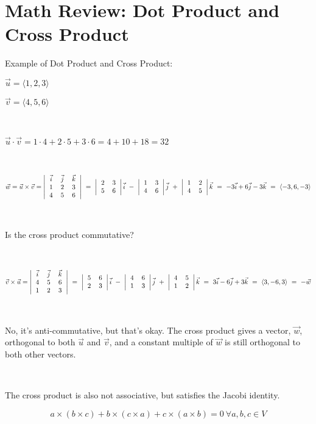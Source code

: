 \section{Math Review:  Dot Product and Cross Product}

Example of Dot Product and Cross Product:

$\vec{u} = \langle 1,2,3 \rangle$

$\vec{v} = \langle 4,5,6 \rangle$

\

$\vec{u} \cdot \vec{v} = 1 \cdot 4 + 2 \cdot 5 + 3 \cdot 6 = 4 + 10 + 18 = 32$

\

$\displaystyle \vec{w} = \vec{u} \times \vec{v} = 
	\left|
	\begin{tabular}{*3{>{$}c<{$}}}
		\vec{i} & \vec{j} & \vec{k} \cr
		1 & 2 & 3 \cr
		4 & 5 & 6 \cr
	\end{tabular}
	\right|
\ = \
	\left|
	\begin{tabular}{cc}
		2 & 3 \cr
		5 & 6 \cr
	\end{tabular}
	\right|
	\vec{i}
\ - \	
	\left|
	\begin{tabular}{cc}
		1 & 3 \cr
		4 & 6 \cr
	\end{tabular}
	\right|
	\vec{j}
\ + \ 
	\left|
	\begin{tabular}{cc}
		1 & 2 \cr
		4 & 5 \cr
	\end{tabular}
	\right|
	\vec{k}
\ = \
	-3\vec{i} + 6 \vec{j} - 3 \vec{k}
\ = \
	\langle -3,6,-3 \rangle
$

\

Is the cross product commutative?

\

$\displaystyle\vec{v} \times \vec{u} = 
	\left|
	\begin{tabular}{*3{>{$}c<{$}}}
		\vec{i} & \vec{j} & \vec{k} \cr
		4 & 5 & 6 \cr
		1 & 2 & 3 \cr
	\end{tabular}
	\right|
\ = \
	\left|
	\begin{tabular}{cc}
		5 & 6 \cr
		2 & 3 \cr
	\end{tabular}
	\right|
	\vec{i}
\ - \	
	\left|
	\begin{tabular}{cc}
		4 & 6 \cr
		1 & 3 \cr
	\end{tabular}
	\right|
	\vec{j}
\ + \ 
	\left|
	\begin{tabular}{cc}
		4 & 5 \cr
		1 & 2 \cr
	\end{tabular}
	\right|
	\vec{k}
\ = \
	3\vec{i} - 6 \vec{j} + 3 \vec{k}
\ = \
	\langle 3,-6,3 \rangle
\ = \ -\vec{w}
$

\

No, it's anti-commutative, but that's okay.  The cross product gives a vector, $\vec{w}$, orthogonal to both $\vec{u}$ and $\vec{v}$, and a constant multiple of $\vec{w}$ is still orthogonal to both other vectors.  

\

The cross product is also not associative, but satisfies the Jacobi identity.

$$a \times (b \times c) + b \times (c \times a) + c \times (a \times b) = 0 \ \forall a, b, c \in V$$

